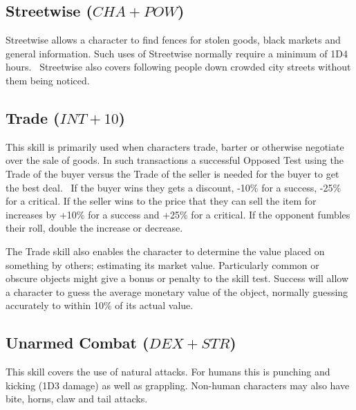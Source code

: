 \subsection{Streetwise ($CHA+POW$)}
Streetwise allows a character to find fences for stolen goods, black markets and general information. Such uses of Streetwise normally require a minimum of 1D4 hours.  Streetwise also covers following people down crowded city streets without them being noticed.

\subsection{Trade ($INT+10$)}
This skill is primarily used when characters trade, barter or otherwise negotiate over the sale of goods. In such transactions a successful Opposed Test using the Trade of the buyer versus the Trade of the seller is needed for the buyer to get the best deal.  If the buyer wins they gets a discount, -10\% for a success, -25\% for a critical. If the seller wins to the price that they can sell the item for increases by +10\% for a success and +25\% for a critical. If the opponent fumbles their roll, double the increase or decrease.

The Trade skill also enables the character to determine the value placed on something by others; estimating its market value. Particularly common or obscure objects might give a bonus or penalty to the skill test. Success will allow a character to guess the average monetary value of the object, normally guessing accurately to within 10\% of its actual value.  


\subsection{Unarmed Combat ($DEX+STR$)}
This skill covers the use of natural attacks. For humans this is punching and kicking (1D3 damage) as well as grappling. Non-human characters may also have bite, horns, claw and tail attacks. 



